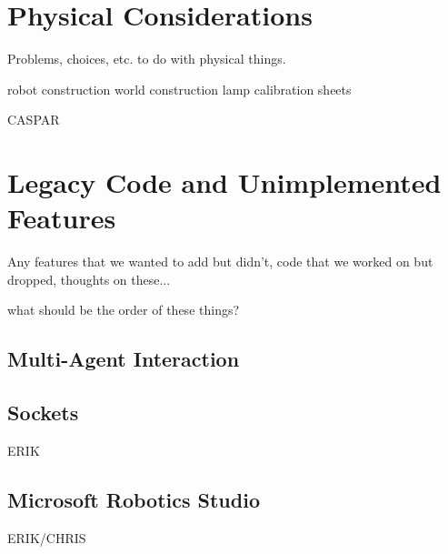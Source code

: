 \documentclass[10pt,twocolumn]{scrartcl}
\begin{document}
\section{Physical Considerations}
Problems, choices, etc. to do with physical things.

robot construction
world construction
lamp
calibration sheets

CASPAR

\section{Legacy Code and Unimplemented Features}
Any features that we wanted to add but didn't, code that we worked on but dropped, thoughts on these...

what should be the order of these things?

\subsection{Multi-Agent Interaction}
\label{sec:multiagent}

\subsection{Sockets}
ERIK

\subsection{Microsoft Robotics Studio}
ERIK/CHRIS
\end{document}
